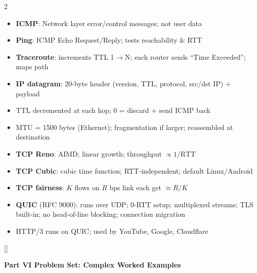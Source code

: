 \documentclass[11pt, letterpaper]{article}
\newcommand{\orangesections}{%
  \titleformat{\section}{\large\bfseries\color{sectionorange}}{}{0em}{}[\color{sectionorange}\titlerule]%
  \titleformat{\subsection}{\normalsize\bfseries\color{sectionorange!80!black}}{}{0em}{}%
}
\newcommand{\partbanner}[3]{%
  \begin{tcolorbox}[colback=#1, colframe=#2, boxrule=1.2pt, arc=4pt,
    left=8pt, right=8pt, top=6pt, bottom=6pt]
    \begin{center}{\LARGE\bfseries #3}\end{center}
  \end{tcolorbox}%
}
\begin{document}
\begin{tcolorbox}[colback=part5bg, colframe=sectionteal,
  title={\bfseries ICMP, Diagnostics \& Modern Transport}, arc=3pt, boxrule=1pt]
\footnotesize
\begin{multicols}{2}
\begin{itemize}[noitemsep, leftmargin=*]
  \item \textbf{ICMP}: Network layer error/control messages; not user data
  \item \textbf{Ping}: ICMP Echo Request/Reply; tests reachability \& RTT
  \item \textbf{Traceroute}: increments TTL 1$\to$N; each router sends ``Time Exceeded''; maps path
  \item \textbf{IP datagram}: 20-byte header (version, TTL, protocol, src/dst IP) + payload
  \item TTL decremented at each hop; 0 = discard + send ICMP back
  \item MTU = 1500 bytes (Ethernet); fragmentation if larger; reassembled at destination
\end{itemize}
\columnbreak
\begin{itemize}[noitemsep, leftmargin=*]
  \item \textbf{TCP Reno}: AIMD; linear growth; throughput $\propto 1/\text{RTT}$
  \item \textbf{TCP Cubic}: cubic time function; RTT-independent; default Linux/Android
  \item \textbf{TCP fairness}: $K$ flows on $R$ bps link each get $\approx R/K$
  \item \textbf{QUIC} (RFC 9000): runs over UDP; 0-RTT setup; multiplexed streams; TLS built-in; no head-of-line blocking; connection migration
  \item HTTP/3 runs on QUIC; used by YouTube, Google, Cloudflare
\end{itemize}
\end{multicols}
\end{tcolorbox}


\newpage

\orangesections
{}
\partbanner{part4bg}{sectionorange}{Part VI \quad Problem Set: Complex Worked Examples}
\end{document}
